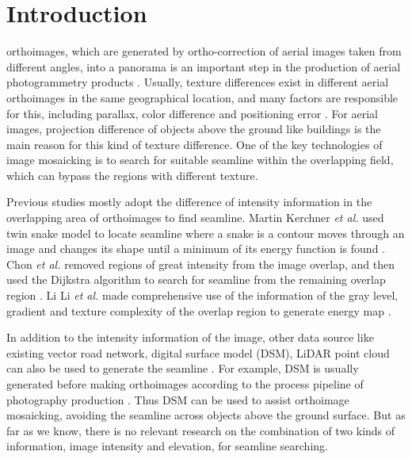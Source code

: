 \documentclass[journal]{IEEEtran}
\begin{document}
\IEEEpeerreviewmaketitle

\section{Introduction}
 orthoimages, which are generated by ortho-correction of aerial images taken from different angles, into a panorama is an important step in the production of aerial photogrammetry products \cite{Chon2010,Pan2014a,Mills2013}. Usually, texture differences exist in different aerial orthoimages in the same geographical location, and many factors are responsible for this, including parallax, color difference and positioning error \cite{Li2015,Yu2012,Zhang2014}. For aerial images, projection difference of objects above the ground like buildings is the main reason for this kind of texture difference. One of the key technologies of image mosaicking is to search for suitable seamline within the overlapping field, which can bypass the regions with different texture.

Previous studies mostly adopt the difference of intensity information in the overlapping area of orthoimages to find seamline. Martin Kerchner \textit{et al.} used twin snake model to locate seamline where a snake is a contour moves through an image and changes its shape until a minimum of its energy function is found \cite{Kerschner2001}. Chon \textit{et al.} removed regions of great intensity from the image overlap, and then used the Dijkstra algorithm to search for seamline from the remaining overlap region \cite{Chon2010}. Li Li \textit{et al.} made comprehensive use of the information of the gray level, gradient and texture complexity of the overlap region to generate energy map \cite{Li2016}. 

In addition to the intensity information of the image, other data source like existing vector road network, digital surface model (DSM), LiDAR point cloud can also be used to generate the seamline \cite{Chen2014,Wan2013,Hong2011Intelligent,Pang2016SGM}. For example, DSM is usually generated before making orthoimages according to the process pipeline of photography production \cite{Mills2013}. Thus DSM can be used to assist orthoimage mosaicking, avoiding the seamline across objects above the ground surface. But as far as we know, there is no relevant research on the combination of two kinds of information, image intensity and elevation, for seamline searching. 
\end{document}
